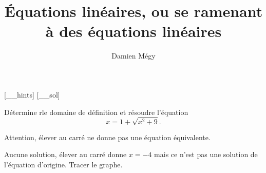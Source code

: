 




[_\jobname_hints]
[_\jobname_sol]


\title{Équations linéaires, ou se ramenant à des équations linéaires}
\author{Damien Mégy}
\maketitle



\begin{exo}
Détermine rle domaine de définition et résoudre l'équation 
\[ x=1+\sqrt{x^2+9}.\]
\begin{hint}
Attention, élever au carré ne donne pas une équation équivalente.
\end{hint}
\begin{sol}
Aucune solution, élever au carré donne $x=-4$ mais ce n'est pas une solution de l'équation d'origine. Tracer le graphe.
\end{sol}
\end{exo}



\begin{exo}
\begin{hint}
\end{hint}
\begin{sol}
\end{sol}
\end{exo}


\begin{exo}
\begin{hint}
\end{hint}
\begin{sol}
\end{sol}
\end{exo}


\begin{exo}
\begin{hint}
\end{hint}
\begin{sol}
\end{sol}
\end{exo}


\begin{exo}
\begin{hint}
\end{hint}
\begin{sol}
\end{sol}
\end{exo}


\begin{exo}
\begin{hint}
\end{hint}
\begin{sol}
\end{sol}
\end{exo}



\indications
\correction



